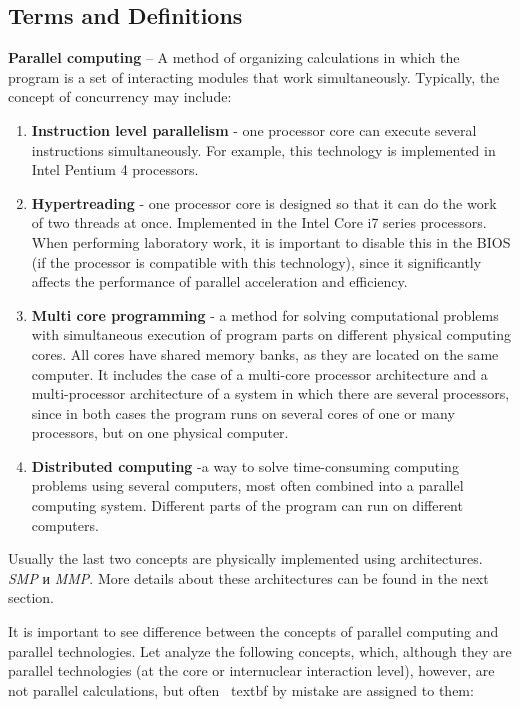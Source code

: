 { %
	\subsection{Terms and Definitions}
	\par\textbf{Parallel computing} – 
A method of organizing calculations in which the program is a set of interacting modules that work simultaneously. Typically, the concept of concurrency may include:
		\begin{enumerate}
			\item\textbf{Instruction level parallelism} - one processor core can execute several instructions simultaneously. For example, this technology is implemented in Intel Pentium 4 processors.
			\item\textbf{Hypertreading} - one processor core is designed so that it can do the work of two threads at once. Implemented in the Intel Core i7 series processors. When performing laboratory work, it is important to disable this in the BIOS (if the processor is compatible with this technology), since it significantly affects the performance of parallel acceleration and efficiency.
			\item\textbf{Multi core programming} -  a method for solving computational problems with simultaneous execution of program parts on different physical computing cores. All cores have shared memory banks, as they are located on the same computer. It includes the case of a multi-core processor architecture and a multi-processor architecture of a system in which there are several processors, since in both cases the program runs on several cores of one or many processors, but on one physical computer.
			\item\textbf{Distributed computing} -a way to solve time-consuming computing problems using several computers, most often combined into a parallel computing system. Different parts of the program can run on different computers.
		\end{enumerate}
Usually the last two concepts are physically implemented using architectures. \textit{SMP} и \textit{MMP}. More details about these architectures can be found in the next section.
	\par It is important to see difference between the concepts of parallel computing and parallel technologies. Let  analyze the following concepts, which, although they are parallel technologies (at the core or internuclear interaction level), however, are not parallel calculations, but often \ textbf {by mistake} are assigned to them:
}
